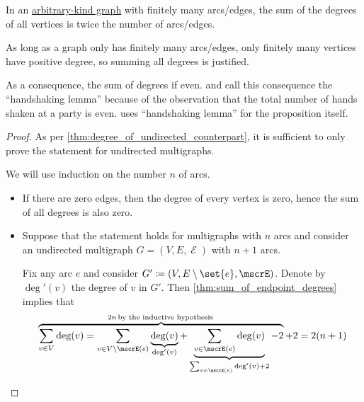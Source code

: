 \begin{proposition}\label{thm:sum_of_graph_degrees}
  In an \hyperref[rem:arbitrary_kind_graph]{arbitrary-kind graph} with finitely many arcs/edges, the sum of the degrees of all vertices is twice the number of arcs/edges.
\end{proposition}
\begin{comments}
  \item As long as a graph only has finitely many arcs/edges, only finitely many vertices have positive degree, so summing all degrees is justified.
  \item As a consequence, the sum of degrees if even.  and  call this consequence the \enquote{handshaking lemma} because of the observation that the total number of hands shaken at a party is even.  uses \enquote{handshaking lemma} for the proposition itself.
\end{comments}
\begin{proof}
  As per \cref{thm:degree_of_undirected_counterpart}, it is sufficient to only prove the statement for undirected multigraphs.

  We will use induction on the number \( n \) of arcs.

  \begin{itemize}
    \item If there are zero edges, then the degree of every vertex is zero, hence the sum of all degrees is also zero.

    \item Suppose that the statement holds for multigraphs with \( n \) arcs and consider an undirected multigraph \( G = (V, E, \mscrE) \) with \( n + 1 \) arcs.

    Fix any arc \( e \) and consider \( G' \coloneqq (V, E \setminus \set{ e }, \mscrE) \). Denote by \( \deg'(v) \) the degree of \( v \) in \( G' \). Then \cref{thm:sum_of_endpoint_degrees} implies that
    \begin{equation*}
      \overbrace{\sum_{v \in V} \deg(v) = \sum_{v \in V \setminus \mscrE(e)} \underbrace{\deg(v)}_{\deg'(v)} + \underbrace{\sum_{v \in \mscrE(e)} \deg(v)}_{\sum_{v \in \mscrE(e)} \deg'(v) + 2} - 2}^{2n \T*{by the inductive hypothesis}} + 2
      =
      2(n + 1)
    \end{equation*}
  \end{itemize}
\end{proof}

